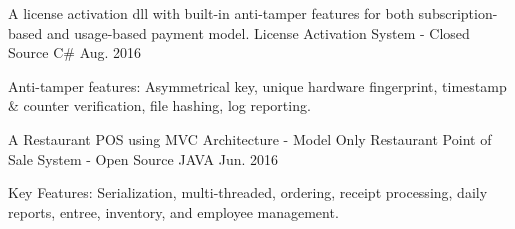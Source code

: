 \begin{cventries}
     \cventry 
    {A license activation dll with built-in anti-tamper features for both subscription-based and usage-based payment model.} %
    {License Activation System - Closed Source} %
    {C\#} %
    {Aug. 2016} %
    {
      \begin{cvitems} %
        \item {Anti-tamper features: Asymmetrical key, unique hardware fingerprint, timestamp \& counter verification, file hashing, log reporting.}
      \end{cvitems}
    }

    \cventry
    {A Restaurant POS using MVC Architecture -  Model Only} %
    {Restaurant Point of Sale System - Open Source} %
    {JAVA} %
    {Jun. 2016} %
    {
      \begin{cvitems} %
          \item {Key Features: Serialization, multi-threaded, ordering, receipt processing, daily reports, entree, inventory, and employee management.}
      \end{cvitems}
    }



\end{cventries}
